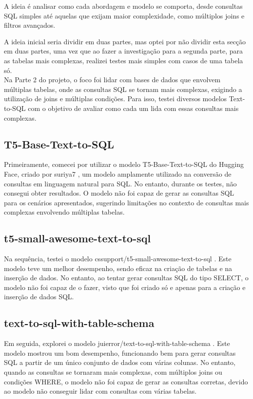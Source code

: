 \documentclass{article}
\begin{document}
A ideia é analisar como cada abordagem e modelo se comporta, desde consultas SQL simples até aquelas que exijam maior complexidade, como múltiplos joins e filtros avançados.

A ideia inicial seria dividir em duas partes, mas optei por não dividir esta secção em duas partes, uma vez que ao fazer a investigação para a segunda parte, para as tabelas mais complexas, realizei testes mais simples com casos de uma tabela só. \\
\hspace*{1em} Na Parte 2 do projeto, o foco foi lidar com bases de dados que envolvem múltiplas tabelas, onde as consultas SQL se tornam mais complexas, exigindo a utilização de joins e múltiplas condições. Para isso, testei diversos modelos Text-to-SQL com o objetivo de avaliar como cada um lida com essas consultas mais complexas.

 \subsection{T5-Base-Text-to-SQL} 
\hspace*{1em}Primeiramente, comecei por utilizar o modelo T5-Base-Text-to-SQL do Hugging Face, criado por suriya7 \cite{raffel2019exploring}, um modelo amplamente utilizado na conversão de consultas em linguagem natural para SQL. No entanto, durante os testes, não consegui obter resultados. O modelo não foi capaz de gerar as consultas SQL para os cenários apresentados, sugerindo limitações no contexto de consultas mais complexas envolvendo múltiplas tabelas. 

\subsection{t5-small-awesome-text-to-sql} 
\hspace*{1em} Na sequência, testei o modelo cssupport/t5-small-awesome-text-to-sql \cite{cssupport_t5small2025}. Este modelo teve um melhor desempenho, sendo eficaz na criação de tabelas e na inserção de dados. No entanto, ao tentar gerar consultas SQL do tipo SELECT, o modelo não foi capaz de o fazer, visto que foi criado só e apenas para a criação e inserção de dados SQL.

\subsection{text-to-sql-with-table-schema} 
\hspace*{1em} Em seguida, explorei o modelo juierror/text-to-sql-with-table-schema \cite{juierror2025}. Este modelo mostrou um bom desempenho, funcionando bem para gerar consultas SQL a partir de um único conjunto de dados com várias colunas. No entanto, quando as consultas se tornaram mais complexas, com múltiplos joins ou condições WHERE, o modelo não foi capaz de gerar as consultas corretas, devido ao modelo não conseguir lidar com consultas com várias tabelas.
\end{document}
